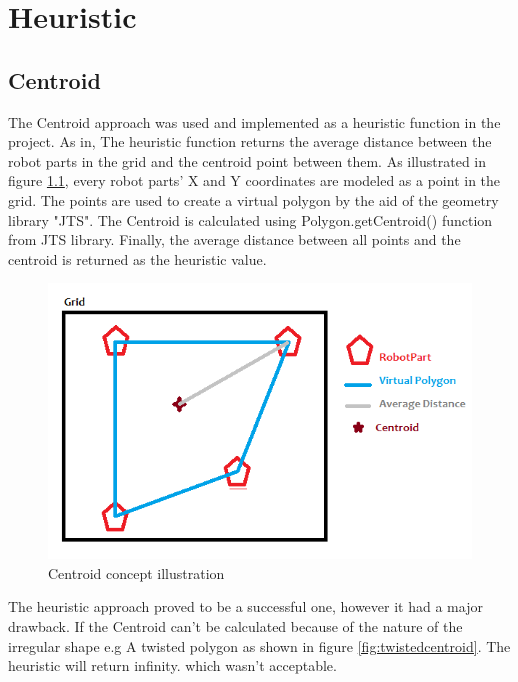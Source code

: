 \chapter{Heuristic}
\section{Centroid}

The Centroid approach was used and implemented as a heuristic function in the project. As in, The heuristic function returns the average distance between the robot parts in the grid and the centroid point between them. As illustrated in figure \ref{fig:centroid_model}, every robot parts' X and Y coordinates are modeled as a point in the grid. The points are used to create a virtual polygon by the aid of the geometry library "JTS". The Centroid is calculated using Polygon.getCentroid() function from JTS library. Finally, the average distance between all points and the centroid is returned as the heuristic value.

\begin{figure}[H] 
   	\centering
	\includegraphics[scale=0.6]{images/Centroid} 
    \caption{Centroid concept illustration}
    \label{fig:centroid_model} 
\end{figure}

The heuristic approach proved to be a successful one, however it had a major drawback. If the Centroid can't be calculated because of the nature of the irregular shape e.g A twisted polygon as shown in figure \ref{fig:twistedcentroid}. The heuristic will return infinity. which wasn't acceptable. 

